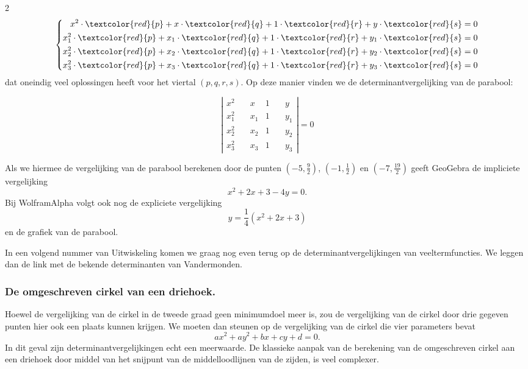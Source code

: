 \begin{multicols}{2}
\[
        \left\{ 
        \begin{aligned}
        x^2 \cdot \textcolor{red}{p}+x \cdot \textcolor{red}{q}+1 \cdot \textcolor{red}{r}+ y \cdot \textcolor{red}{s} &=0 \\
        x_1^2 \cdot \textcolor{red}{p}+x_1 \cdot \textcolor{red}{q}+1 \cdot \textcolor{red}{r}+ y_1 \cdot \textcolor{red}{s} &=0 \\
        x_2^2 \cdot \textcolor{red}{p}+x_2 \cdot \textcolor{red}{q}+1 \cdot \textcolor{red}{r}+ y_2 \cdot \textcolor{red}{s} &=0 \\
        x_3^2 \cdot \textcolor{red}{p}+x_3 \cdot \textcolor{red}{q}+1 \cdot \textcolor{red}{r}+ y_3 \cdot \textcolor{red}{s} &=0  
        \end{aligned} 
        \right.
    \]
    dat oneindig veel oplossingen heeft voor het viertal $(p,q,r,s)$. Op deze manier vinden we de determinantvergelijking van de parabool:

    \[\left| \begin{aligned} 
        x^2 \quad & x  & 1  & \quad y \\
        x_1^2 \quad & x_1 & 1  & \quad y_1 \\ 
        x_2^2 \quad & x_2  & 1  & \quad y_2 \\
        x_3^2 \quad & x_3  & 1  & \quad y_3
    \end{aligned}  \right| =0\]  

    Als we hiermee de vergelijking van de parabool berekenen door de punten $(-5,\frac{9}{2})$, $(-1,\frac{1}{2})$ en $(-7,\frac{19}{2})$ geeft GeoGebra de impliciete vergelijking
    \[x^2+2x+3-4y=0.\]
    Bij WolframAlpha volgt ook nog de expliciete vergelijking
    \[y=\frac{1}{4} (x^2+2x+3)\]
    en de grafiek van de parabool.

    In een volgend nummer van Uitwiskeling komen we graag nog even terug op de determinantvergelijkingen van veeltermfuncties. We leggen dan de link met de bekende determinanten van Vandermonden.

    \subsubsection*{De omgeschreven cirkel van een driehoek.}
    Hoewel de vergelijking van de cirkel in de tweede graad geen minimumdoel meer is, zou de vergelijking van de cirkel door drie gegeven punten hier ook een plaats kunnen krijgen. We moeten dan steunen op de vergelijking van de cirkel die vier parameters bevat
    \[ax^2+ay^2+bx+cy+d=0.\]
    In dit geval zijn determinantvergelijkingen echt een meerwaarde. De klassieke aanpak van de berekening van de omgeschreven cirkel aan een driehoek door middel van het snijpunt van de middelloodlijnen van de zijden, is veel complexer.


\end{multicols}
